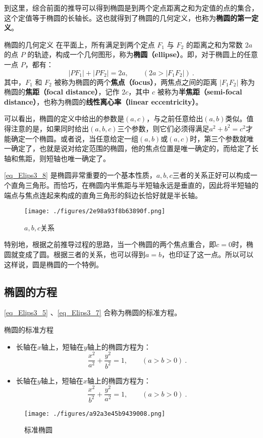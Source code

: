 到这里，综合前面的推导可以得到椭圆是到两个定点距离之和为定值的点的集合，这个定值等于椭圆的长轴长。这也就得到了椭圆的几何定义，也称为\textbf{椭圆的第一定义}。

\begin{definition}{椭圆的几何定义}
在平面上，所有满足到两个定点 $F_1$ 与 $F_2$ 的距离之和为常数 $2a$ 的点 $P$ 的轨迹，构成一个几何图形，称为\textbf{椭圆（ellipse）}。即，对于椭圆上的任意一点 $P$，都有：
\begin{equation}\label{eq_Elips3_9}
|PF_1| + |PF_2| = 2a ,\qquad(2a>|F_1F_2|)~.
\end{equation}
其中，$F_1$ 和 $F_2$ 被称为椭圆的两个\textbf{焦点（focus）}，两焦点之间的距离 $|F_1F_2|$ 称为椭圆的\textbf{焦距（focal distance）}，记作 $2c$，其中 $c$ 被称为\textbf{半焦距（semi-focal distance）}，也称为椭圆的\textbf{线性离心率（linear eccentricity）}。
\end{definition}

可以看出，椭圆的定义中给出的参数是$(a,c)$，与之前任意给出$(a,b)$类似。值得注意的是，如果同时给出$(a,b,c)$三个参数，则它们必须得满足$a^2+b^2=c^2$才能确定一个椭圆。或者说，当任意给定一组$(a,b)$或$(a,c)$时，第三个参数就唯一确定了，也就是说对给定范围的椭圆，他的焦点位置是唯一确定的，而给定了长轴和焦距，则短轴也唯一确定了。

\autoref{eq_Elips3_8} 是椭圆非常重要的一个基本性质，$a,b,c$三者的关系正好可以构成一个直角三角形。而恰巧，在椭圆内半焦距与半短轴永远是垂直的，因此将半短轴的端点与焦点连起来构成的直角三角形的斜边长恰好就是半长轴。
\begin{figure}[ht]
\centering
\texttt{[image: ./figures/2e98a93f8b63890f.png]}
\caption{$a,b,c$关系} \label{fig_Elips3_3}
\end{figure}
特别地，根据之前推导过程的思路，当一个椭圆的两个焦点重合，即$c=0$时，椭圆就变成了圆。根据三者的关系，也可以得到$a=b$，也印证了这一点。所以可以这样说，圆是椭圆的一个特例。

\subsection{椭圆的方程}

\autoref{eq_Elips3_5} 、\autoref{eq_Elips3_7} 合称为椭圆的标准方程。
\begin{theorem}{椭圆的标准方程}
\begin{itemize}
\item 长轴在$x$轴上，短轴在$y$轴上的椭圆方程为：
\begin{equation}\label{eq_Elips3_3}
\frac{x^2}{a^2} + \frac{y^2}{b^2} = 1,\qquad(a>b>0)~.
\end{equation}
\item 长轴在$y$轴上，短轴在$x$轴上的椭圆方程为：
\begin{equation}
\frac{x^2}{b^2} + \frac{y^2}{a^2} = 1,\qquad(a>b>0)~.
\end{equation}
\end{itemize}
\end{theorem}
\begin{figure}[ht]
\centering
\texttt{[image: ./figures/a92a3e45b9439008.png]}
\caption{标准椭圆} \label{fig_Elips3_2}
\end{figure}

